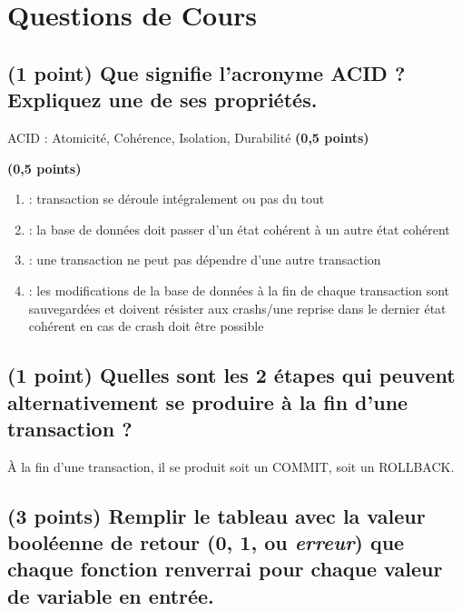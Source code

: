 \documentclass[11pt,a4paper]{article}
\begin{document}
\MakeExamTitle                   %


\section{Questions de Cours}

\subsection{(1 point) Que signifie l'acronyme ACID ? Expliquez une de ses propriétés.}

\bigskip

ACID : Atomicité, Cohérence, Isolation, Durabilité  \textbf{(0,5 points)}

\textbf{(0,5 points)}
\begin{enumerate}
\item {} : transaction se déroule intégralement ou pas du tout
\item {} : la base de données doit passer d'un état cohérent à un autre état cohérent
\item {} : une transaction ne peut pas dépendre d'une autre transaction
\item {} : les modifications de la base de données à la fin de chaque transaction sont sauvegardées et doivent résister aux crashs/une reprise dans le dernier état cohérent en cas de crash doit être possible
\end{enumerate}

\bigskip

\subsection{(1 point) Quelles sont les 2 étapes qui peuvent alternativement se produire à la fin d'une transaction ?}

\bigskip

\`A la fin d'une transaction, il se produit soit un COMMIT, soit un ROLLBACK.

\bigskip

\subsection{(3 points) Remplir le tableau avec la valeur booléenne de retour (0, 1, ou \textit{erreur}) que chaque fonction renverrai pour chaque valeur de variable en entrée.}
\end{document}
